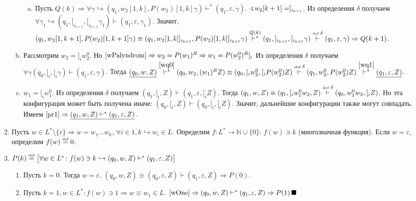 \documentclass[a4paper]{article}
\def\eqdef{\overset{\mbox{\tiny def}}{=}}
\begin{document}
\begin{enumerate}
\begin{enumerate}[a.]
\begin{enumerate}[a.]
\item Пусть $Q(k)\Rightarrow\forall\gamma\hookrightarrow(q_1,w_2[1,k],P(w_2)[1,k]\gamma)\vdash^*(q_1,\varepsilon,\gamma)$. $\varangle w_2[k+1]=]_{i_{k+1}}$.\newline
Из определения $\delta$ получаем $\forall\gamma_1\hookrightarrow (q_1,]_{i_{k+1}},[_{i_{k+1}}\gamma_1)\vdash(q_1,\varepsilon,\gamma_1)$.\newline
Значит, $(q_1,w_2[1,k+1],P(w_2)[1,k+1]\gamma)\equiv(q_1,w_2[1,k]]_{i_{k+1}},P(w_2)[1,k][_{i_{k+1}}\gamma)\overset{Q(k)}{\vdash^*}(q_1,]_{i_{k+1}},[_{i_{k+1}}\gamma)\overset{\mbox{\tiny def }\delta}{\vdash}(q_1,\varepsilon,\gamma)\Rightarrow Q(k+1)$.
\end{enumerate}
\item \label{pr1} Рассмотрим $w_2=]_iw^0_2$. Но $\ref{wPalyndrom}\Rightarrow w_2=P(w_1)^R\Rightarrow w_1=P(w^0_2)^R[_i$ Из определения $\delta$ получаем $\forall\gamma(q_0,]_i,[_i\gamma)\vdash(q_1,\varepsilon,\gamma)$. Тогда $\underline{(q_0,w,Z)}\overset{\ref{wq0}}{\vdash^*}(q_0,w_2,(w_1)^RZ)\equiv(q_0,]_iw^0_2,[_iP(w^0_2)Z)\overset{\mbox{\tiny def }\delta}{\vdash}(q_1,w^0_2,P(w^0_2)Z)\overset{\ref{wq1}}{\vdash^*}\underline{(q_1,\varepsilon,Z)}$.
\item $w_1=[_iw^0_1$. Из определения $\delta$ получаем $(q_1,[_i,Z)\vdash(q_1,\varepsilon,[_iZ)$. Тогда $(q_1,w,Z)\equiv(q_1,[_iw^0_1w_2,Z)\overset{\mbox{\tiny def }\delta}{\vdash}(q_0,w^0_1w_2,[_iZ)$. Но эта конфигурация может быть получена иначе: $(q_0,[_i,Z)\vdash(q_0,[_i,[_iZ)$. Значит, дальнейшие конфигурации также могут совпадать. Имеем $\ref{pr1}\Rightarrow\underline{(q_1,w,Z)\vdash^*(q_1,\varepsilon,Z)}$.
\end{enumerate}
\item Пусть $w\in L^*\setminus\{\varepsilon\}\Rightarrow w=w_1...w_k$, $\forall i\in\overline{1,k}\hookrightarrow w_i\in L$. Определим $f\colon L^*\longrightarrow {\mathbb N}\cup\{0\}$: $f(w)\ni k$ (многозначная функция). Если $w=\varepsilon$, определим $f(w)\eqdef 0$.
\item $P(k)\eqdef\big[\forall w\in L^*\colon f(w)\ni k\hookrightarrow (q_0,w,Z)\vdash^*(q_1,\varepsilon,Z)\big]$\begin{enumerate}
\item Пусть $k=0$. Тогда $w=\varepsilon$. $(q_0,w,Z)\equiv(q_0,\varepsilon,Z)\vdash(q_1,\varepsilon,Z)\Rightarrow P(0)$.
\item Пусть $k=1, w\in L^*\colon f(w)\ni 1\Rightarrow w\equiv w_1\in L$. $\ref{wOne}\Rightarrow (q_0,w,Z)\vdash^*(q_1,\varepsilon,Z)\Rightarrow P(1)\,\blacksquare$

\end{enumerate}
\end{enumerate}
\end{document}
